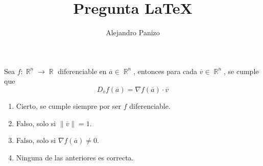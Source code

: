 \documentclass[10pt,spanish,hyperref={pdfpagelabels=false}]{beamer}
\author{Alejandro Panizo}
\title{Pregunta \LaTeX}
\DeclareMathOperator{\RR}{\mathbb{R}}
\begin{document}
\Large

\rightskip=0pt

\begin{frame}

Sea $f :\RR ^n \to \RR$ diferenciable en $\overline{a}\in \RR ^n$, entonces para cada $\overline {v}\in \RR ^n$, se cumple que
$$D_{\overline{v}} f(\overline{a}) = \nabla f(\overline{a}) \cdot \overline {v} $$
\medskip



\begin{enumerate}[1.] \rightskip=0pt
\item Cierto, se cumple siempre por ser $f$ diferenciable.
\item Falso, solo si $\|\overline{v}\|=1$.
\item Falso, solo si $\nabla f(\overline{a})\neq 0$.
\item Ninguna de las anteriores es correcta.
\end{enumerate}


\end{frame}
\end{document}
